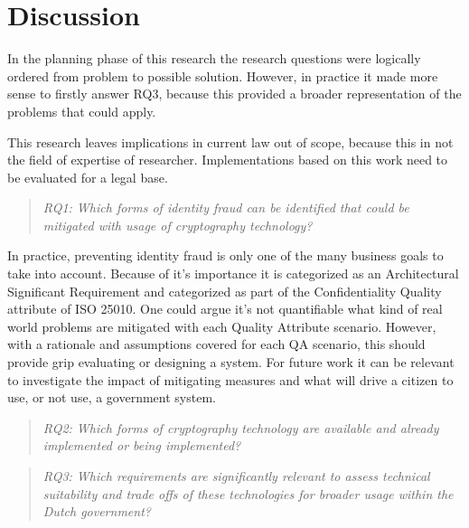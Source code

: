 \chapter{Discussion}\label{s:discussion}
In the planning phase of this research the research questions were logically ordered from problem to possible solution. However, in practice it made more sense to firstly answer RQ3, because this provided a broader representation of the problems that could apply. 

This research leaves implications in current law out of scope, because this in not the field of expertise of researcher. Implementations based on this work need to be evaluated for a legal base.

\begin{quote}\emph{RQ1: Which forms of identity fraud can be identified that could be mitigated with usage of cryptography technology?}\end{quote}
In practice, preventing identity fraud is only one of the many business goals to take into account. Because of it's importance it is categorized as an Architectural Significant Requirement and categorized as part of the Confidentiality Quality attribute of ISO 25010. One could argue it's not quantifiable what kind of real world problems are mitigated with each Quality Attribute scenario. However, with a rationale and assumptions covered for each QA scenario, this should provide grip evaluating or designing a system. For future work it can be relevant to investigate the impact of mitigating measures and what will drive a citizen to use, or not use, a government system.
\begin{quote}\emph{RQ2: Which forms of cryptography technology are available and already implemented or being implemented?}\end{quote}

\lipsum[1-1]

\begin{quote}\emph{RQ3: Which requirements are significantly relevant to assess technical suitability and trade offs of these technologies for broader usage within the Dutch government?}\end{quote}
\lipsum[1-1]

